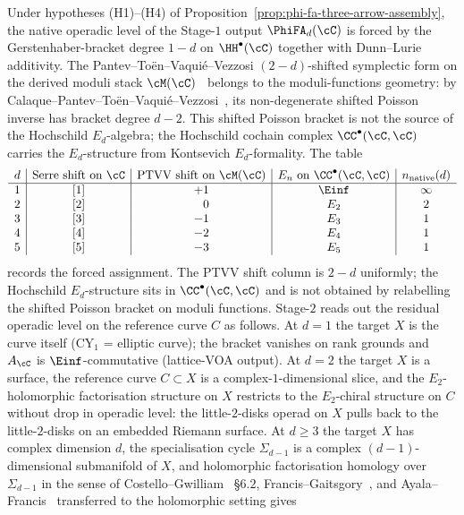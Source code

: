 \begin{proposition}
\label{prop:ptvv-shift-law}
Under hypotheses \textup{(H1)--(H4)} of Proposition~\ref{prop:phi-fa-three-arrow-assembly}, the native operadic level of the Stage-$1$ output $\PhiFA_d(\cC)$ is forced by the Gerstenhaber-bracket degree $1 - d$ on $\HH^\bullet(\cC)$ together with Dunn--Lurie additivity. The Pantev--To\"en--Vaqui\'e--Vezzosi $(2-d)$-shifted symplectic form on the derived moduli stack $\cM(\cC)$~\cite{PTVV2013} belongs to the moduli-functions geometry: by Calaque--Pantev--To\"en--Vaqui\'e--Vezzosi~\cite{CPTVV2017}, its non-degenerate shifted Poisson inverse has bracket degree \(d-2\). This shifted Poisson bracket is not the source of the Hochschild \(E_d\)-algebra; the Hochschild cochain complex $\CC^\bullet(\cC, \cC)$ carries the $E_d$-structure from Kontsevich $E_d$-formality. The table
\[
\begin{array}{c|c|c|c|c}
 d & \textup{Serre shift on } \cC & \textup{PTVV shift on } \cM(\cC) & E_n \textup{ on } \CC^\bullet(\cC,\cC) & n_{\mathrm{native}}(d) \\\hline
 1 & \textup{[1]} & +1 & \Einf & \infty \\
 2 & \textup{[2]} & \phantom{-}0 & E_2 & 2 \\
 3 & \textup{[3]} & -1 & E_3 & 1 \\
 4 & \textup{[4]} & -2 & E_4 & 1 \\
 5 & \textup{[5]} & -3 & E_5 & 1
\end{array}
\]
records the forced assignment. The PTVV shift column is $2 - d$ uniformly; the Hochschild $E_d$-structure sits in $\CC^\bullet(\cC, \cC)$ and is not obtained by relabelling the shifted Poisson bracket on moduli functions. Stage-$2$ reads out the residual operadic level on the reference curve $C$ as follows. At $d = 1$ the target $X$ is the curve itself \textup{(}CY$_1$ = elliptic curve\textup{);} the bracket vanishes on rank grounds and $A_\cC$ is $\Einf$-commutative \textup{(}lattice-VOA output\textup{).} At $d = 2$ the target $X$ is a surface, the reference curve $C \subset X$ is a complex-$1$-dimensional slice, and the $E_2$-holomorphic factorisation structure on $X$ restricts to the $E_2$-chiral structure on $C$ without drop in operadic level: the little-$2$-disks operad on $X$ pulls back to the little-$2$-disks on an embedded Riemann surface. At $d \geq 3$ the target $X$ has complex dimension $d$, the specialisation cycle $\Sigma_{d-1}$ is a complex $(d-1)$-dimensional submanifold of $X$, and holomorphic factorisation homology over $\Sigma_{d-1}$ in the sense of Costello--Gwilliam~\cite{CostelloGwilliam2017} \S$6.2$, Francis--Gaitsgory~\cite{FrancisGaitsgory2012}, and Ayala--Francis~\cite{AyalaFrancis2015} transferred to the holomorphic setting gives

\end{proposition}
